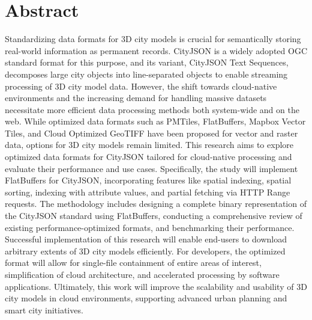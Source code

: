 
\chapter*{Abstract}
Standardizing data formats for 3D city models is crucial for semantically storing real-world information as permanent records.
CityJSON is a widely adopted OGC standard format for this purpose, and its variant, CityJSON Text Sequences, decomposes large city objects into line-separated objects to enable streaming processing of 3D city model data.
However, the shift towards cloud-native environments and the increasing demand for handling massive datasets necessitate more efficient data processing methods both system-wide and on the web.
While optimized data formats such as PMTiles, FlatBuffers, Mapbox Vector Tiles, and Cloud Optimized GeoTIFF have been proposed for vector and raster data, options for 3D city models remain limited.
This research aims to explore optimized data formats for CityJSON tailored for cloud-native processing and evaluate their performance and use cases.
Specifically, the study will implement FlatBuffers for CityJSON, incorporating features like spatial indexing, spatial sorting, indexing with attribute values, and partial fetching via HTTP Range requests.
The methodology includes designing a complete binary representation of the CityJSON standard using FlatBuffers, conducting a comprehensive review of existing performance-optimized formats, and benchmarking their performance.
Successful implementation of this research will enable end-users to download arbitrary extents of 3D city models efficiently.
For developers, the optimized format will allow for single-file containment of entire areas of interest, simplification of cloud architecture, and accelerated processing by software applications.
Ultimately, this work will improve the scalability and usability of 3D city models in cloud environments, supporting advanced urban planning and smart city initiatives.